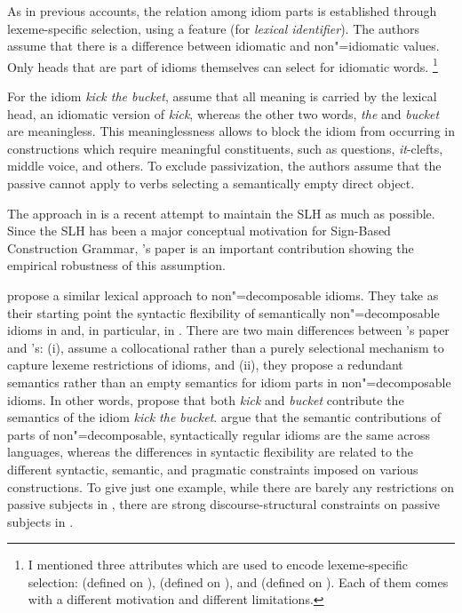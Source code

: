 \documentclass[output=paper,biblatex,babelshorthands,newtxmath,draftmode,colorlinks,citecolor=brown]{langscibook}
\begin{document}
As in previous accounts, the relation among idiom parts is established through lexeme-specific
selection, using a feature  (for \emph{lexical identifier}).  The authors assume that
there is a difference between idiomatic and non"=idiomatic  values.  Only heads that are
part of idioms themselves can select for idiomatic words.%
\footnote{I mentioned three attributes which are used to encode lexeme-specific selection:   (defined on ),  (defined on ), and  (defined on ). Each of them comes with a different motivation and different limitations.}

For the idiom \emph{kick the bucket}, \citet{KSF2015a} assume that all meaning is carried by the
lexical head, an idiomatic version of \emph{kick}, whereas the other two words, \emph{the} and
\emph{bucket} are meaningless.  This meaninglessness allows \citeauthor{KSF2015a} to block the idiom from
occurring in constructions which require meaningful constituents, such as questions,
\emph{it}-clefts, middle voice, and others.  To exclude passivization, the authors assume that the
 passive cannot apply to verbs selecting a semantically empty direct object.

The approach in \citet{KSF2015a} is a recent attempt to maintain the SLH as much as possible.  Since
the SLH has been a major conceptual motivation for Sign-Based Construction Grammar\indexsbcg, \citeauthor{KSF2015a}'s paper is an important contribution showing the
empirical robustness of this assumption.

\citet{Bargmann:Sailer:18} propose a similar lexical approach to non"=de\-com\-pos\-able idioms.
They take as their starting point the syntactic flexibility of semantically non"=decomposable idioms
in  and, in particular, in .  There are two main differences between
\citeauthor{KSF2015a}'s paper and \citeauthor{Bargmann:Sailer:18}'s: (i),
\citeauthor{Bargmann:Sailer:18} assume a collocational rather than a purely selectional mechanism to
capture lexeme restrictions of idioms, and (ii), they propose a redundant semantics rather than an
empty semantics for idiom parts in non"=decomposable idioms. In other words,
\citet{Bargmann:Sailer:18} propose that both \emph{kick} and \emph{bucket} contribute the semantics
of the idiom \emph{kick the bucket}.  \citeauthor{Bargmann:Sailer:18} argue that the semantic
contributions of parts of non"=decomposable, syntactically regular idioms are the same across
languages, whereas the differences in syntactic flexibility are related to the different syntactic,
semantic, and pragmatic constraints imposed on various constructions.  To give just one example,
while there are barely any restrictions on passive subjects in , there are strong
discourse-structural constraints on passive subjects in .
\end{document}
